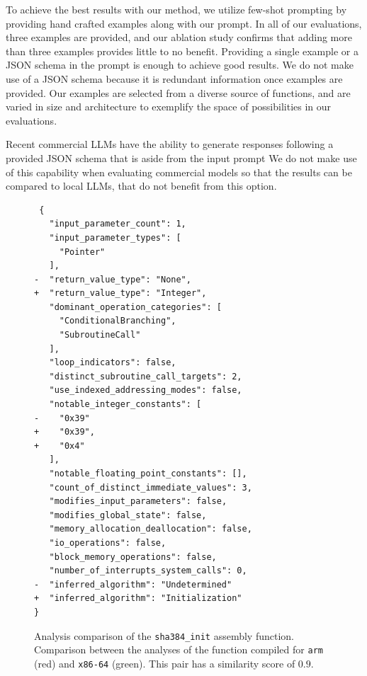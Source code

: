 To achieve the best results with our method, we utilize few-shot prompting by providing hand crafted examples along with our prompt.
In all of our evaluations, three examples are provided, and our ablation study confirms that adding more than three examples provides
little to no benefit. Providing a single example or a JSON schema in the prompt is enough to achieve good results. We do not
make use of a JSON schema because it is redundant information once examples are provided. Our examples are selected from a
diverse source of functions, and are varied in size and architecture to exemplify the space of possibilities in our evaluations.

Recent commercial LLMs have the ability to generate responses following a provided JSON schema that is aside from the input prompt
We do not make use of this capability when evaluating commercial models so that the results can be compared to local LLMs,
that do not benefit from this option.

\begin{figure}[ht]
\centering
\begin{minipage}{0.95\linewidth}
\begin{verbatim}
 {
   "input_parameter_count": 1,
   "input_parameter_types": [
     "Pointer"
   ],
-  "return_value_type": "None",
+  "return_value_type": "Integer",
   "dominant_operation_categories": [
     "ConditionalBranching",
     "SubroutineCall"
   ],
   "loop_indicators": false,
   "distinct_subroutine_call_targets": 2,
   "use_indexed_addressing_modes": false,
   "notable_integer_constants": [
-    "0x39"
+    "0x39",
+    "0x4"
   ],
   "notable_floating_point_constants": [],
   "count_of_distinct_immediate_values": 3,
   "modifies_input_parameters": false,
   "modifies_global_state": false,
   "memory_allocation_deallocation": false,
   "io_operations": false,
   "block_memory_operations": false,
   "number_of_interrupts_system_calls": 0,
-  "inferred_algorithm": "Undetermined"
+  "inferred_algorithm": "Initialization"
}
\end{verbatim}
\caption{Analysis comparison of the \texttt{sha384\_init} assembly function. Comparison between the analyses of the function compiled 
for \texttt{arm} (red) and \texttt{x86-64} (green). This pair has a similarity score of \(0.9\).}
\label{feature-diff}
\end{minipage}
\end{figure}

